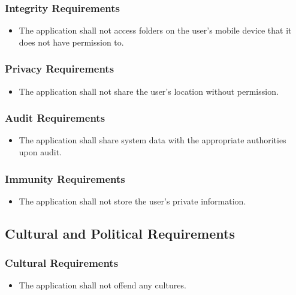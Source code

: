 \documentclass[]{article}
\begin{document}
\subsubsection{Integrity Requirements}
\label{ssub:integrity_requirements}
\begin{itemize}
	\item The application shall not access folders on the user's mobile device that it does not have permission to.
\end{itemize}

\subsubsection{Privacy Requirements}
\label{ssub:privacy_requirements}
\begin{itemize}
	\item The application shall not share the user's location without permission. 
\end{itemize}

\subsubsection{Audit Requirements}
\label{ssub:audit_requirements}
\begin{itemize}
	\item The application shall share system data with the appropriate authorities upon audit. 
\end{itemize}

\subsubsection{Immunity Requirements}
\label{ssub:immunity_requirements}
\begin{itemize}
	\item The application shall not store the user's private information.
	\end{itemize}


\subsection{Cultural and Political Requirements}
\label{sub:cultural_and_political_requirements}

\subsubsection{Cultural Requirements}
\label{ssub:cultural_requirements}
\begin{itemize}
	\item The application shall not offend any cultures.
\end{itemize}
\end{document}
